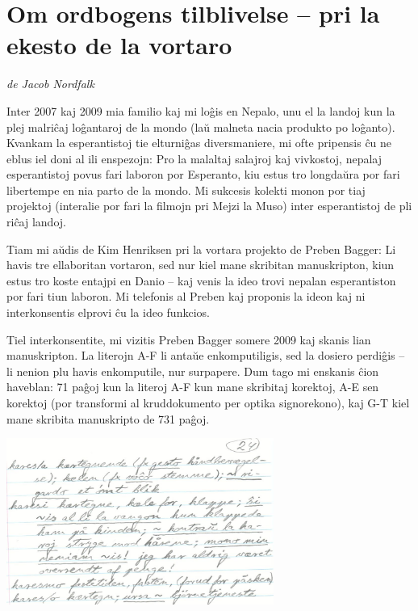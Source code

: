 \section{Om ordbogens tilblivelse -- pri la ekesto de la vortaro}
{\itshape
de Jacob Nordfalk}

{
Inter 2007 kaj 2009 mia familio kaj mi lo\^gis en Nepalo, unu el la
landoj kun la plej malri\^caj lo\^gantaroj de la mondo (la\u{u} malneta
nacia produkto po lo\^ganto). Kvankam la esperantistoj tie elturni\^gas
diversmaniere, mi ofte pripensis \^cu ne eblus iel doni al ili
enspezojn: Pro la malaltaj salajroj kaj vivkostoj, nepalaj
esperantistoj povus fari laboron por Esperanto, kiu estus tro
longda\u{u}ra por fari libertempe en nia parto de la mondo. Mi sukcesis
kolekti monon por tiaj projektoj (interalie por fari la filmojn pri
Mejzi la Muso) inter esperantistoj de pli ri\^caj landoj.}

{
Tiam mi a\u{u}dis de Kim Henriksen pri la vortara projekto de Preben
Bagger: Li havis tre ellaboritan vortaron, sed nur kiel mane skribitan
manuskripton, kiun estus tro koste entajpi en Danio -- kaj venis la
ideo trovi nepalan esperantiston por fari tiun laboron. Mi telefonis al
Preben kaj proponis la ideon kaj ni interkonsentis elprovi \^cu la ideo
funkcios. }

{
Tiel interkonsentite, mi vizitis Preben Bagger somere 2009 kaj skanis
lian manuskripton. La literojn A-F li anta\u{u}e enkomputiligis, sed la
dosiero perdi\^gis -- li nenion plu havis enkomputile, nur surpapere.
Dum tago mi enskanis \^cion haveblan: 71 pa\^goj kun la literoj A-F kun
mane skribitaj korektoj, A-E sen korektoj (por transformi al
kruddokumento per optika signorekono), kaj G-T kiel mane skribita
manuskripto de 731 pa\^goj. }

{\centering{}

\includegraphics[width=8.749cm,height=5.443cm]{origino.png}
 
\par}

